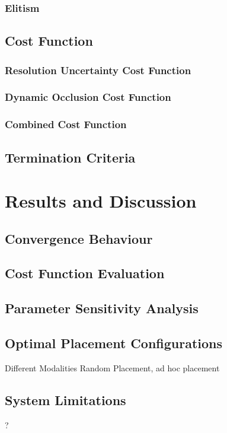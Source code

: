 \subsubsection{Elitism}
\subsection{Cost Function}
\subsubsection{Resolution Uncertainty Cost Function}
\subsubsection{Dynamic Occlusion Cost Function}
\subsubsection{Combined Cost Function}
\subsection{Termination Criteria}


\section{Results and Discussion}
\subsection{Convergence Behaviour}
\subsection{Cost Function Evaluation}
\subsection{Parameter Sensitivity Analysis}
\subsection{Optimal Placement Configurations}
Different Modalities
Random Placement, ad hoc placement 
\subsection{System Limitations} ?